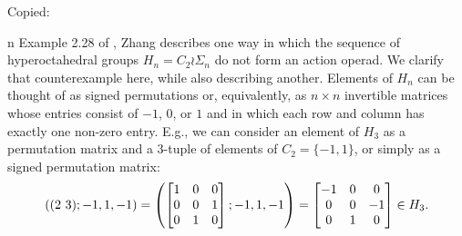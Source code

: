 \begin{example}\label{ex:counterex2}
Copied:

n Example 2.28 of \cite{zhang-grp}, Zhang describes one way in which the sequence of hyperoctahedral groups $H_n = C_2 \wr \Sigma_n$ do not form an action operad. We clarify that counterexample here, while also describing another. Elements of $H_n$ can be thought of as signed permutations or, equivalently, as $n \times n$ invertible matrices whose entries consist of $-1$, $0$, or $1$ and in which each row and column has exactly one non-zero entry. E.g., we can consider an element of $H_3$ as a permutation matrix and a $3$-tuple of elements of $C_2 = \{-1,1\}$, or simply as a signed permutation matrix:
  \[
    \left(( 2 \, \, 3 )
    ;
    -1,1,-1\right)
    =
    \left(\begin{bmatrix}
    1 & 0 & 0 \\
    0 & 0 & 1 \\
    0 & 1 & 0
    \end{bmatrix}
    ;
    -1,1,-1\right)
    =
    \begin{bmatrix}
    -1 & 0 & 0 \\
    0 & 0 & -1 \\
    0 & 1 & 0
    \end{bmatrix}
    \in H_3.
  \]


\end{example}
